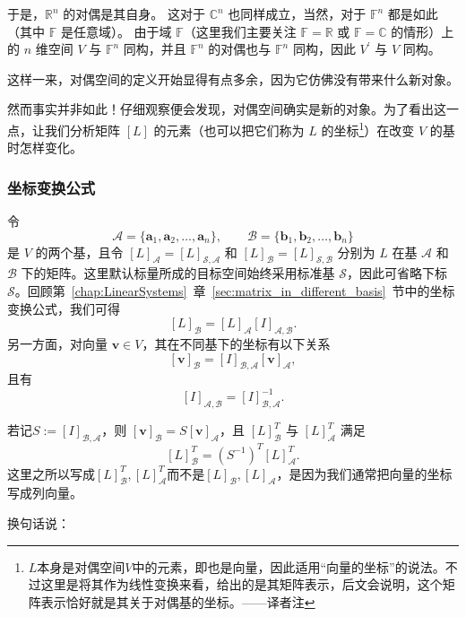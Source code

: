 于是，$\mathbb{R}^n$ 的对偶是其自身。
这对于 $\mathbb{C}^n$ 也同样成立，当然，对于 $\mathbb{F}^n$ 都是如此（其中 $\mathbb{F}$ 是任意域）。
由于域 $\mathbb{F}$（这里我们主要关注 $\mathbb{F} = \mathbb{R}$ 或 $\mathbb{F} = \mathbb{C}$ 的情形）上的 $n$ 维空间 $V$ 与 $\mathbb{F}^n$ 同构，并且 $\mathbb{F}^n$ 的对偶也与 $\mathbb{F}^n$ 同构，因此 $V^\prime$ 与 $V$ 同构。

这样一来，对偶空间的定义开始显得有点多余，因为它仿佛没有带来什么新对象。

然而事实并非如此！仔细观察便会发现，对偶空间确实是新的对象。为了看出这一点，让我们分析矩阵 $[L]$ 的元素（也可以把它们称为 $L$ 的坐标\footnote{$L$本身是对偶空间$V$中的元素，即也是向量，因此适用“向量的坐标”的说法。不过这里是将其作为线性变换来看，给出的是其矩阵表示，后文会说明，这个矩阵表示恰好就是其关于对偶基的坐标。——译者注}）在改变 $V$ 的基时怎样变化。

\subsubsection{坐标变换公式}

令
\[
    \mathcal{A}=\{\mathbf{a}_1,\mathbf{a}_2,\ldots,\mathbf{a}_n\},\qquad
    \mathcal{B}=\{\mathbf{b}_1,\mathbf{b}_2,\ldots,\mathbf{b}_n\}
\]
是 $V$ 的两个基，且令 $[L]_{\mathcal{A}}=[L]_{\mathcal{S},\mathcal{A}}$ 和
$[L]_{\mathcal{B}}=[L]_{\mathcal{S},\mathcal{B}}$ 分别为 $L$ 在基 $\mathcal{A}$ 和 $\mathcal{B}$ 下的矩阵。这里默认标量所成的目标空间始终采用标准基 $\mathcal{S}$，因此可省略下标 $\mathcal{S}$。回顾第~\ref{chap:LinearSystems}~章~\ref{sec:matrix_in_different_basis}~节中的坐标变换公式，我们可得
\[
    [L]_{\mathcal{B}}=[L]_{\mathcal{A}}[I]_{\mathcal{A},\mathcal{B}}.
\]
另一方面，对向量 $\mathbf{v}\in V$，其在不同基下的坐标有以下关系
\[
    [\mathbf{v}]_{\mathcal{B}}
    =[I]_{\mathcal{B},\mathcal{A}}[\mathbf{v}]_{\mathcal{A}},
\]
且有
\[
    [I]_{\mathcal{A},\mathcal{B}}
    =[I]_{\mathcal{B},\mathcal{A}}^{-1}.
\]

若记$S:=[I]_{\mathcal{B},\mathcal{A}}$，则 $[\mathbf{v}]_{\mathcal{B}}=S[\mathbf{v}]_{\mathcal{A}}$，且 $[L]_{\mathcal{B}}^T$ 与
$[L]_{\mathcal{A}}^T$ 满足
\begin{equation}\label{eq:dual_change_coordinate}
    [L]_{\mathcal{B}}^T
    =\left(S^{-1}\right)^T[L]_{\mathcal{A}}^T.
\end{equation}
这里之所以写成$[L]_{\mathcal{B}}^T,[L]_{\mathcal{A}}^T$而不是$[L]_{\mathcal{B}},[L]_{\mathcal{A}}$，是因为我们通常把向量的坐标写成列向量。

换句话说：
\begin{center}
\end{center}

